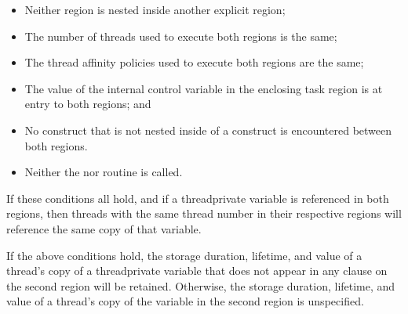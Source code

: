 \begin{itemize} 
\item Neither  region is nested inside another explicit 
       region;
\item The number of threads used to execute both  regions is the same;
\item The thread affinity policies used to execute both  
      regions are the same;
\item The value of the  internal control variable in the enclosing 
      task region is  at entry to both  regions; and
\item No  construct that is not nested inside of a 
      construct is encountered between both  regions.
\item Neither the  nor  
      routine is called.
\end{itemize}

If these conditions all hold, and if a threadprivate variable is referenced in 
both regions, then threads with the same thread number in their respective 
regions will reference the same copy of that variable.

\begin{ccppspecific}
If the above conditions hold, the storage duration, lifetime, and value of a 
thread's copy of a threadprivate variable that does not appear in any 
 clause on the second region will be retained. Otherwise, the 
storage duration, lifetime, and value of a thread's copy of the variable in 
the second region is unspecified.
\end{ccppspecific}

